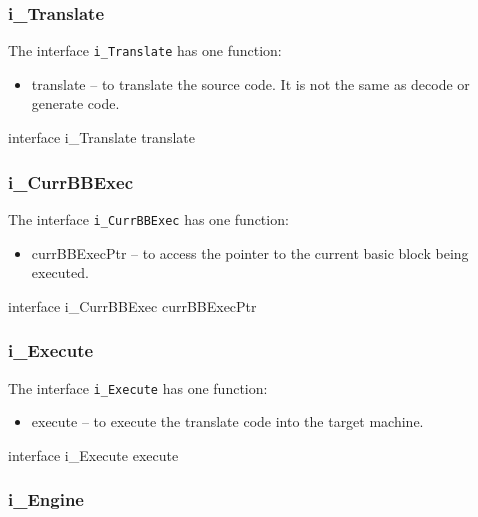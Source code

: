 \documentclass[11pt]{report}
\begin{document}
			\subsubsection*{i\_Translate}
			
			\par The interface \texttt{i\_Translate} has one function:
			\begin{itemize}
				\item translate -- to translate the source code. It is not the same as decode or generate code.
			\end{itemize}
			
			\begin{EL}
			interface i_Translate{
				translate 
			}
			\end{EL}

			\subsubsection*{i\_CurrBBExec}
			
			\par The interface \texttt{i\_CurrBBExec} has one function:
			\begin{itemize}
				\item currBBExecPtr -- to access the pointer to the current basic block being executed.
			\end{itemize}
			
			\begin{EL}
			interface i_CurrBBExec{
				currBBExecPtr
			}
			\end{EL}
			
			\subsubsection*{i\_Execute}
			
			\par The interface \texttt{i\_Execute} has one function:
			\begin{itemize}
				\item execute -- to execute the translate code into the target machine.
			\end{itemize}
			
			\begin{EL}
			interface i_Execute{
				execute
			}
			\end{EL}
			
			\subsubsection*{i\_Engine}
			
\end{document}
